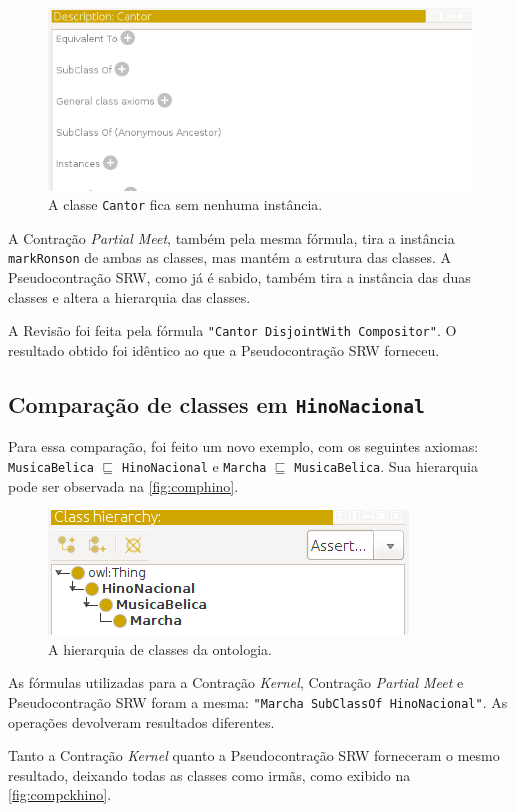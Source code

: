 \begin{figure}[H]
	\centering
	\includegraphics[width=0.5\linewidth]{Capitulos/Testes/compckcantor3}
	\caption{A classe \texttt{Cantor} fica sem nenhuma instância.}
	\label{fig:compckcantor3}
\end{figure}

A Contração \textit{Partial Meet}, também pela mesma fórmula, tira a instância \texttt{markRonson} de ambas as classes, mas mantém a estrutura das classes. A Pseudocontração SRW, como já é sabido, também tira a instância das duas classes e altera a hierarquia das classes.

A Revisão foi feita pela fórmula \texttt{"Cantor DisjointWith Compositor"}. O resultado obtido foi idêntico ao que a Pseudocontração SRW forneceu. 

\subsection{Comparação de classes em \texttt{HinoNacional}}

Para essa comparação, foi feito um novo exemplo, com os seguintes axiomas: \texttt{MusicaBelica} $ \sqsubseteq $ \texttt{HinoNacional} e \texttt{Marcha} $ \sqsubseteq $ \texttt{MusicaBelica}. Sua hierarquia pode ser observada na \autoref{fig:comphino}. 

\begin{figure}[H]
	\centering
	\includegraphics[width=0.5\linewidth]{Capitulos/Testes/comphino}
	\caption{A hierarquia de classes da ontologia.}
	\label{fig:comphino}
\end{figure}

As fórmulas utilizadas para a Contração \textit{Kernel}, Contração \textit{Partial Meet} e Pseudocontração SRW foram a mesma: \texttt{"Marcha SubClassOf HinoNacional"}. As operações devolveram resultados diferentes.

Tanto a Contração \textit{Kernel} quanto a Pseudocontração SRW forneceram o mesmo resultado, deixando todas as classes como irmãs, como exibido na \autoref{fig:compckhino}.

